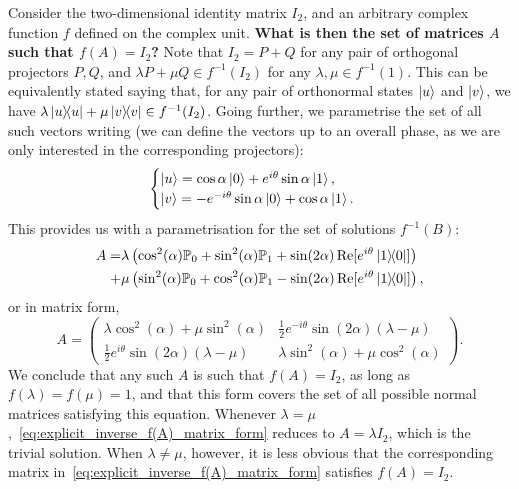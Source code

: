 \begin{example}[label={ex:solutions_f(A)=I2}]
Consider the two-dimensional identity matrix $I_2$, and an arbitrary complex function $f$ defined on the complex unit. \textbf{What is then the set of matrices $A$ such that $f(A)=I_2$?}
Note that $I_2=P+Q$ for any pair of orthogonal projectors $P,Q$, and $\lambda P + \mu Q\in f^{-1}(I_2)$ for any $\lambda,\mu\in f^{-1}(1)$.
This can be equivalently stated saying that, for any pair of orthonormal states $\ket u$ and $\ket v$, we have
$\lambda \ketbra u + \mu \ketbra v\in f^{-1}(I_2)$.
Going further, we parametrise the set of all such vectors writing (we can define the vectors up to an overall phase, as we are only interested in the corresponding projectors):
\begin{equation}
    \begin{cases}
    \ket u =\cos\alpha\ket 0+e^{i\theta}\sin\alpha \ket 1, \\
    \ket v =-e^{-i\theta}\sin\alpha\ket 0 + \cos\alpha\ket 1.
\end{cases}
\end{equation}
This provides us with a parametrisation for the set of solutions $f^{-1}(B)$:
\begin{equation}
\begin{aligned}
    A = &\lambda\left(\cos^2(\alpha) \mathbb{P}_0 + \sin^2(\alpha) \mathbb{P}_1 + \sin(2\alpha)\Re[e^{i\theta}\ketbra{1}{0}]\right) \\
    +&\mu\left(
        \sin^2(\alpha) \mathbb{P}_0 + \cos^2(\alpha) \mathbb{P}_1 - \sin(2\alpha)\Re[e^{i\theta}\ketbra{1}{0}]
    \right),
\end{aligned}
\end{equation}
or in matrix form,
\begin{equation}
    A = \begin{pmatrix}
        \lambda \cos^2(\alpha)+\mu\sin^2(\alpha) &
        \frac12 e^{-i\theta} \sin(2\alpha) (\lambda-\mu) \\ 
        \frac12 e^{i\theta} \sin(2\alpha) (\lambda-\mu) &
        \lambda \sin^2(\alpha)+\mu\cos^2(\alpha)
    \end{pmatrix}.
    \label{eq:explicit_inverse_f(A)_matrix_form}
\end{equation}
We conclude that any such $A$ is such that $f(A)=I_2$, as long as $f(\lambda)=f(\mu)=1$, and that this form covers the set of all possible normal matrices satisfying this equation.
Whenever $\lambda=\mu$,~\cref{eq:explicit_inverse_f(A)_matrix_form} reduces to $A=\lambda I_2$, which is the trivial solution. When $\lambda\neq\mu$, however, it is less obvious that the corresponding matrix in~\cref{eq:explicit_inverse_f(A)_matrix_form} satisfies $f(A)=I_2$.
\end{example}

